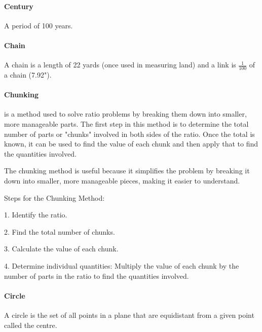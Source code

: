\documentclass[12pt]{article}
\begin{document}

\paragraph{Century}
A period of 100 years.

\paragraph{Chain}
A chain is a length of 22 yards (once used in measuring land) and a link is $\frac{1}{100}$ of a chain (7.92").

\paragraph{Chunking} is a method used to solve ratio problems by breaking them down into smaller, more manageable parts. The first step in this method is to determine the total number of parts or "chunks" involved in both sides of the ratio. Once the total is known, it can be used to find the value of each chunk and then apply that to find the quantities involved.

The chunking method is useful because it simplifies the problem by breaking it down into smaller, more manageable pieces, making it easier to understand.

Steps for the Chunking Method:

1. Identify the ratio.

2. Find the total number of chunks.

3. Calculate the value of each chunk.

4. Determine individual quantities: Multiply the value of each chunk by the number of parts in the ratio to find the quantities involved.

\paragraph{Circle}
A circle is the set of all points in a plane that are equidistant from a given point called the centre.

\begin{center}
\end{center}
\end{document}
